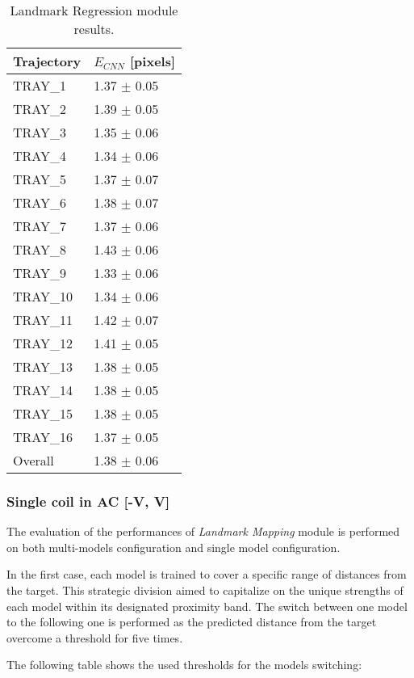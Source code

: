 \begin{table}[H]
\label{tab:2DErrorResultsTrain}
\centering
\begin{tabular}{l | l }
\toprule
Trajectory & $E_{CNN}$ [pixels]\\
\midrule
TRAY\_1 & 1.37 $\pm$ 0.05 \\
TRAY\_2 & 1.39 $\pm$ 0.05 \\
TRAY\_3 & 1.35 $\pm$ 0.06 \\
TRAY\_4 & 1.34 $\pm$ 0.06 \\
TRAY\_5 & 1.37 $\pm$ 0.07 \\
TRAY\_6 & 1.38 $\pm$ 0.07 \\
TRAY\_7 & 1.37 $\pm$ 0.06 \\
TRAY\_8 & 1.43 $\pm$ 0.06 \\
TRAY\_9 & 1.33 $\pm$ 0.06 \\
TRAY\_10 & 1.34 $\pm$ 0.06 \\
TRAY\_11 & 1.42 $\pm$ 0.07 \\
TRAY\_12 & 1.41 $\pm$ 0.05 \\
TRAY\_13 & 1.38 $\pm$ 0.05 \\
TRAY\_14 & 1.38 $\pm$ 0.05 \\
TRAY\_15 & 1.38 $\pm$ 0.05 \\
TRAY\_16 & 1.37 $\pm$ 0.05 \\
\midrule
Overall & 1.38 $\pm$ 0.06\\
\bottomrule
\end{tabular}
\caption{Landmark Regression module results.}
\end{table}

\subsubsection{Single coil in AC [-V, V]}

The evaluation of the performances of \textit{Landmark Mapping} module is performed on both multi-models configuration and single model configuration.

In the first case, each model is trained to cover a specific range of distances from the target. This strategic division aimed to capitalize on the unique strengths of each model within its designated proximity band. The switch between one model to the following one is performed as the predicted distance from the target overcome a threshold for five times.

The following table shows the used thresholds for the models switching:

